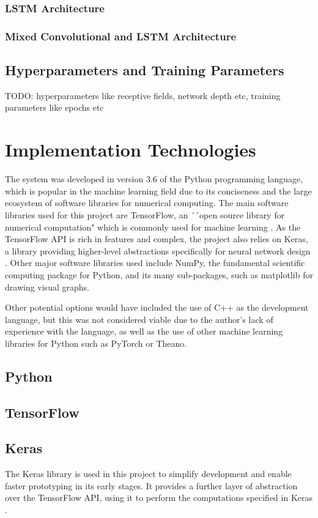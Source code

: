 \documentclass[12pt, titlepage]{report}
\theoremstyle{definition}
\begin{document}
\subsubsection{LSTM Architecture}
\subsubsection{Mixed Convolutional and LSTM Architecture}
\subsection{Hyperparameters and Training Parameters}
TODO: hyperparameters like receptive fields, network depth etc, training parameters like epochs etc
\section{Implementation Technologies}
The system was developed in version 3.6 of the Python programming language, which is popular in the machine learning field due to its conciseness and the large ecosystem of software libraries for numerical computing. The main software libraries used for this project are TensorFlow, an ´´open source library for numerical computation" which is commonly used for machine learning \cite{tensorflow}. As the TensorFlow API is rich in features and complex, the project also relies on Keras, a library providing higher-level abstractions specifically for neural network design \cite{keras}. Other major software libraries used include NumPy, the fundamental scientific computing package for Python, and its many sub-packages, such as matplotlib for drawing visual graphs\cite{numpy}.

Other potential options would have included the use of C++ as the development language, but this was not considered viable due to the author's lack of experience with the language, as well as the use of other machine learning libraries for Python such as PyTorch or Theano.

\subsection{Python}
\subsection{TensorFlow}
\subsection{Keras}
The Keras library is used in this project to simplify development and enable faster prototyping in its early stages. It provides a further layer of abstraction over the TensorFlow API, using it to perform the computations specified in Keras \cite{keras}.
\end{document}
